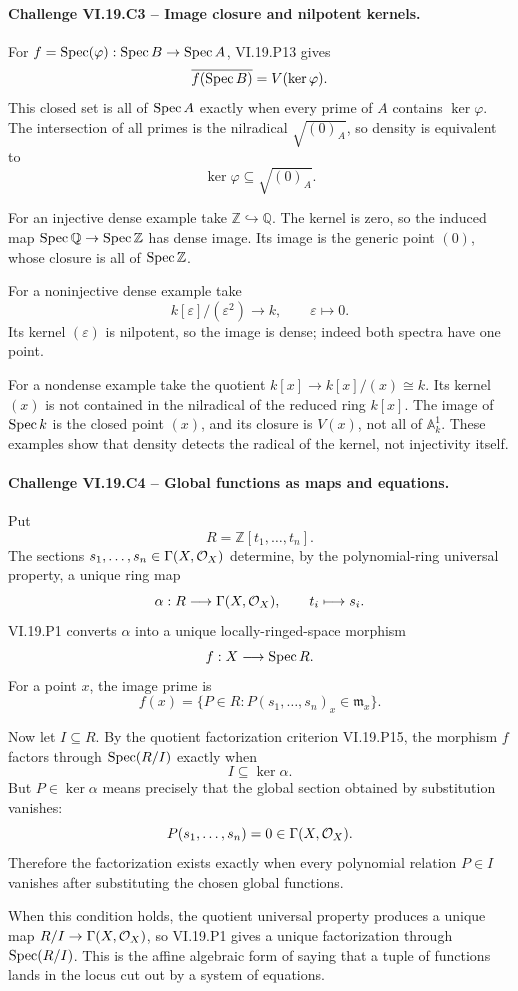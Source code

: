\paragraph{Challenge VI.19.C3 -- Image closure and nilpotent kernels.}
\begin{solution}
For \(f=\operatorname{Spec}(\varphi):\operatorname{Spec} B\to\operatorname{Spec} A\), VI.19.P13 gives
\[
\overline{f(\operatorname{Spec} B)}=V(\ker\varphi).
\]
This closed set is all of \(\operatorname{Spec} A\) exactly when every prime of \(A\) contains \(\ker\varphi\).  The intersection of all primes is the nilradical \(\sqrt{(0)_A}\), so density is equivalent to
\[
\ker\varphi\subseteq\sqrt{(0)_A}.
\]

For an injective dense example take \(\mathbb Z\hookrightarrow\mathbb Q\).  The kernel is zero, so the induced map \(\operatorname{Spec}\mathbb Q\to\operatorname{Spec}\mathbb Z\) has dense image.  Its image is the generic point \((0)\), whose closure is all of \(\operatorname{Spec}\mathbb Z\).

For a noninjective dense example take
\[
k[\varepsilon]/(\varepsilon^2)\longrightarrow k,
\qquad \varepsilon\longmapsto0.
\]
Its kernel \((\varepsilon)\) is nilpotent, so the image is dense; indeed both spectra have one point.

For a nondense example take the quotient \(k[x]\to k[x]/(x)\cong k\).  Its kernel \((x)\) is not contained in the nilradical of the reduced ring \(k[x]\).  The image of \(\operatorname{Spec} k\) is the closed point \((x)\), and its closure is \(V(x)\), not all of \(\mathbb A^1_k\).  These examples show that density detects the radical of the kernel, not injectivity itself.
\end{solution}

\paragraph{Challenge VI.19.C4 -- Global functions as maps and equations.}
\begin{solution}
Put\[
R=\mathbb Z[t_1,\ldots,t_n].
\]
The sections \(s_1,\ldots,s_n\in\Gamma(X,\mathcal O_X)\) determine, by the polynomial-ring universal property, a unique ring map
\[
\alpha:R\longrightarrow\Gamma(X,\mathcal O_X),
\qquad t_i\longmapsto s_i.
\]
VI.19.P1 converts \(\alpha\) into a unique locally-ringed-space morphism
\[
f:X\longrightarrow\operatorname{Spec} R.
\]
For a point \(x\), the image prime is
\[
f(x)=\{P\in R:P(s_1,\ldots,s_n)_x\in\mathfrak m_x\}.
\]

Now let \(I\subseteq R\).  By the quotient factorization criterion VI.19.P15, the morphism \(f\) factors through \(\operatorname{Spec}(R/I)\) exactly when
\[
I\subseteq\ker\alpha.
\]
But \(P\in\ker\alpha\) means precisely that the global section obtained by substitution vanishes:
\[
P(s_1,\ldots,s_n)=0\in\Gamma(X,\mathcal O_X).
\]
Therefore the factorization exists exactly when every polynomial relation \(P\in I\) vanishes after substituting the chosen global functions.

When this condition holds, the quotient universal property produces a unique map \(R/I\to\Gamma(X,\mathcal O_X)\), so VI.19.P1 gives a unique factorization through \(\operatorname{Spec}(R/I)\).  This is the affine algebraic form of saying that a tuple of functions lands in the locus cut out by a system of equations.
\end{solution}

